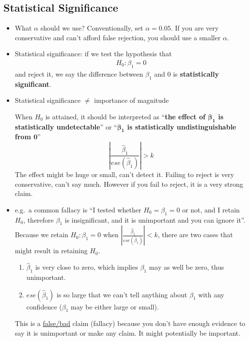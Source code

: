 \documentclass[12 pt]{article}
\begin{document}
    \subsection{Statistical Significance}
    \begin{itemize}
    \item What $\alpha$ should we use? Conventionally, set $\alpha =
      0.05$. If you are very conservative and can't afford false
      rejection, you should use a smaller $\alpha$.
    \item Statistical significance: if we test the hypothesis that
      \begin{align*}
        H_0: \beta_1 = 0
      \end{align*}
      and reject it, we say the difference between $\beta_1$ and $0$ is
      \textbf{statistically significant}.
    \item Statistical significance $\neq$ importance of magnitude

      When $H_0$ is attained, it should be interpreted as
      ``\textbf{the effect of $\mathbf{\beta_1}$ is statistically
        undetectable}'' or ``\textbf{$\mathbf{\beta_1}$ is
        statistically undistinguishable from $\mathbf{0}$}''
      $$\left|\frac{\hat{\beta}_1}{ese(\hat{\beta}_1)}\right| > k$$
      The effect might be huge or small, can't detect it. Failing to
      reject is very conservative, can't say much. However if you fail
      to reject, it is a very strong claim.
    \item e.g.\ a common fallacy is ``I tested whether $H_0 = \beta_1
      = 0$ or not, and I retain $H_0$, therefore $\beta_1$ is
      insignificant, and it is unimportant and you can ignore
      it''. Because we retain $H_0: \beta_1 = 0$ when $\left|
        \frac{\hat{\beta}_1}{ese(\hat{\beta}_1)}\right| < k$, there
      are two cases that might result in retaining $H_0$.
      \begin{enumerate}[(1)]
      \item $\hat{\beta}_1$ is very close to zero, which implies
        $\beta_1$ may as well be zero, thus unimportant.
      \item $ese(\hat{\beta}_1)$ is so large that we can't tell
        anything about $\beta_1$ with any confidence ($\beta_1$ may be
        either large or small).
      \end{enumerate}
      This is a \underline{false/bad} claim (fallacy) because you don't have
      enough evidence to say it is unimportant or make any claim. It
      might potentially be important.
    \end{itemize}
\end{document}
